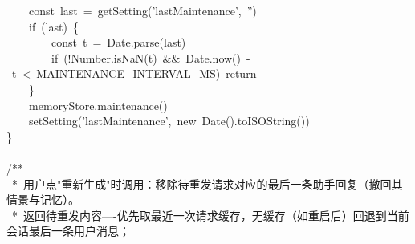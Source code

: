 \documentclass[a4paper,10pt]{article}
\begin{document}
{~~~~const~last~=~getSetting('lastMaintenance',~'')\\
~~~~if~(last)~\{\\
~~~~~~~~const~t~=~Date.parse(last)\\
~~~~~~~~if~(!Number.isNaN(t)~\&\&~Date.now()~-~t~<~MAINTENANCE\_INTERVAL\_MS)~return\\
~~~~\}\\
~~~~memoryStore.maintenance()\\
~~~~setSetting('lastMaintenance',~new~Date().toISOString())\\
\}\\
\mbox{}\\
/**\\
~*~用户点"重新生成"时调用：移除待重发请求对应的最后一条助手回复（撤回其情景与记忆）。\\
~*~返回待重发内容----优先取最近一次请求缓存，无缓存（如重启后）回退到当前会话最后一条用户消息；
}

\newpage
\end{document}
